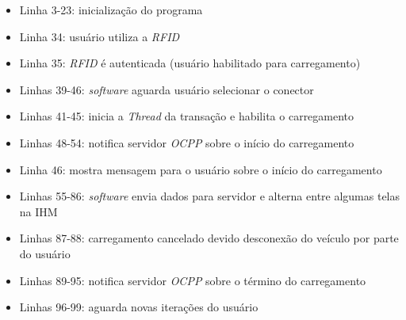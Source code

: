     \begin{itemize}
      \item Linha 3-23: inicialização do programa
      \item Linha 34: usuário utiliza a \textit{\ac{RFID}}
      \item Linha 35: \textit{\ac{RFID}} é autenticada (usuário habilitado para carregamento)
      \item Linhas 39-46: \textit{software} aguarda usuário selecionar o conector
      \item Linhas 41-45: inicia a \textit{Thread} da transação e habilita o carregamento
      \item Linhas 48-54: notifica servidor \textit{\ac{OCPP}} sobre o início do carregamento
      \item Linha 46: mostra mensagem para o usuário sobre o início do carregamento
      \item Linhas 55-86: \textit{software} envia dados para servidor e alterna entre algumas telas na \ac{IHM}
      \item Linhas 87-88: carregamento cancelado devido desconexão do veículo por parte do usuário
      \item Linhas 89-95: notifica servidor \textit{\ac{OCPP}} sobre o término do carregamento
      \item Linhas 96-99: aguarda novas iterações do usuário
    \end{itemize}